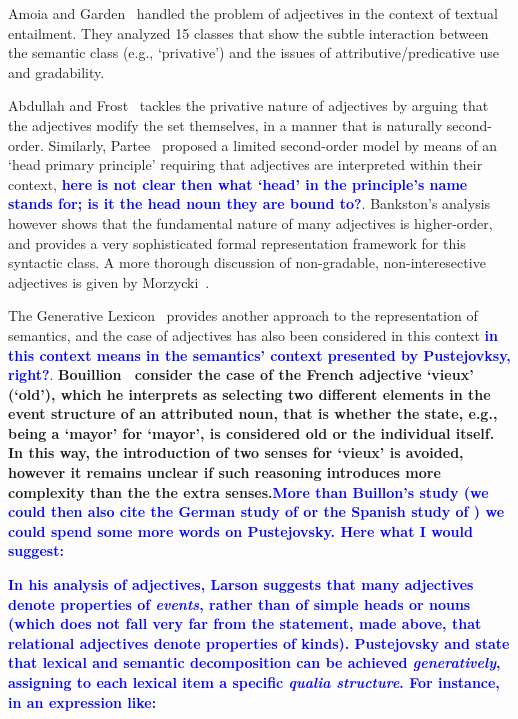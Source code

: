 \documentclass[11pt]{article}
\begin{document}
Amoia and Garden~ handled the problem of adjectives in the context of textual entailment. They analyzed 15 classes that show the subtle interaction between the semantic class (e.g., `privative') and the issues of attributive/predicative use and gradability. 

Abdullah and Frost~ tackles the privative nature of adjectives by arguing that the adjectives modify the set themselves, in a manner that is naturally second-order. Similarly, Partee~ proposed a limited second-order model by means of an `head primary principle' requiring that adjectives are interpreted within their context, \textbf{\textcolor{blue}{here is not clear then what `head' in the principle's name stands for; is it the head noun they are bound to?}}. Bankston's analysis~ however shows that the fundamental nature of many adjectives is higher-order, and provides a very sophisticated formal representation framework for this syntactic class.
A more thorough discussion of non-gradable, non-interesective adjectives is given by Morzycki~.

The Generative Lexicon~\cite{pustejovsky1991generative} provides another approach to the representation of semantics, and the case of adjectives has also been considered in this context \textbf{\textcolor{blue}{in this context means in the semantics' context presented by Pustejovksy, right?}}. \textbf{Bouillion~ consider the case of the French adjective `vieux' (`old'), which he interprets as selecting two different
elements in the event structure of an attributed noun, that is whether the
state, e.g., being a `mayor' for `mayor', is considered old or the individual
itself. In this way, the introduction of two senses for `vieux' is avoided, 
however it remains unclear if such reasoning introduces more complexity than
the the extra senses.\textcolor{blue}{More than Buillon's study (we could then also cite the German study of \cite{beck2000relational} or the Spanish study of \cite{mcnally2004relational}) we could spend some more words on Pustejovsky. Here what I would suggest:}}

\textbf{\textcolor{blue}{In his analysis of adjectives, Larson  suggests that many adjectives denote properties of \textit{events}, rather than of simple heads or nouns (which does not fall very far from the statement, made above, that relational adjectives denote properties of kinds). Pustejovsky  and \cite{lenci2000qualia} state that lexical and semantic decomposition can be achieved \textit{generatively}, assigning to each lexical item a specific \textit{qualia structure}. For instance, in an expression like:}}
\end{document}
